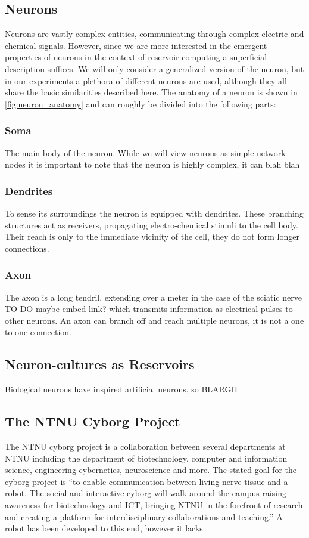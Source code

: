 \subsection{Neurons}
Neurons are vastly complex entities, communicating through complex electric
and chemical signals. However, since we are more interested in the emergent
properties of neurons in the context of reservoir computing a superficial
description suffices.
We will only consider a generalized version of the neuron, but in our
experiments a plethora of different neurons are used, although they
all share the basic similarities described here.
The anatomy of a neuron is shown in \ref{fig:neuron_anatomy} and can roughly be
divided into the following parts:
\subsubsection{Soma}
The main body of the neuron. While we will view neurons as simple network nodes
it is important to note that the neuron is highly complex, it can blah blah
\subsubsection{Dendrites}
To sense its surroundings the neuron is equipped with dendrites. These
branching structures act as receivers, propagating electro-chemical stimuli to
the cell body. Their reach is only to the immediate vicinity of the cell, they
do not form longer connections.
\subsubsection{Axon}
The axon is a long tendril, extending over a meter in the case of the sciatic
nerve TO-DO maybe embed link? which transmits information as electrical pulses
to other neurons. An axon can branch off and reach multiple neurons, it is not a
one to one connection.
\subsection{Neuron-cultures as Reservoirs}
Biological neurons have inspired artificial neurons, so BLARGH
\subsection{The NTNU Cyborg Project}
The NTNU cyborg project is a collaboration between several departments at NTNU
including the department of biotechnology, computer and information science,
engineering cybernetics, neuroscience and more. \cite{fossen_ntnu_???}
The stated goal for the cyborg project is ``to enable communication between living
nerve tissue and a robot. The social and interactive cyborg will walk around the campus
raising awareness for biotechnology and ICT, bringing NTNU in the forefront of research
and creating a platform for interdisciplinary collaborations and teaching.''
A robot has been developed to this end, however it lacks 
